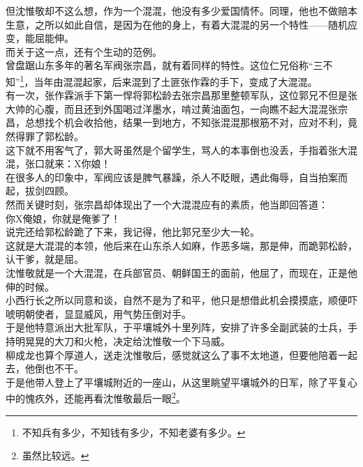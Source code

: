 \begin{multicols}{\theparacolNo}
但沈惟敬却不这么想，作为一个混混，他没有多少爱国情怀。同理，他也不做赔本生意，之所以如此自信，是因为在他的身上，有着大混混的另一个特性——随机应变，能屈能伸。\\

而关于这一点，还有个生动的范例。\\

曾盘踞山东多年的著名军阀张宗昌，就有着同样的特性。这位仁兄俗称“三不知”\footnote{不知兵有多少，不知钱有多少，不知老婆有多少。}，当年由混混起家，后来混到了土匪张作霖的手下，变成了大混混。\\

有一次，张作霖派手下第一悍将郭松龄去张宗昌那里整顿军队，这位郭兄不但是张大帅的心腹，而且还到外国喝过洋墨水，啃过黄油面包，一向瞧不起大混混张宗昌，总想找个机会收拾他，结果一到地方，不知张混混那根筋不对，应对不利，竟然得罪了郭松龄。\\

这下就不用客气了，郭大哥虽然是个留学生，骂人的本事倒也没丢，手指着张大混混，张口就来：X你娘！\\

在很多人的印象中，军阀应该是脾气暴躁，杀人不眨眼，遇此侮辱，自当拍案而起，拔剑四顾。\\

然而关键时刻，张宗昌却体现出了一个大混混应有的素质，他当即回答道：\\

你X俺娘，你就是俺爹了！\\

说完还给郭松龄跪了下来，我记得，他比郭兄至少大一轮。\\

这就是大混混的本领，他后来在山东杀人如麻，作恶多端，那是伸，而跪郭松龄，认干爹，就是屈。\\

沈惟敬就是一个大混混，在兵部官员、朝鲜国王的面前，他屈了，而现在，正是他伸的时候。\\

小西行长之所以同意和谈，自然不是为了和平，他只是想借此机会摸摸底，顺便吓唬明朝使者，显显威风，用气势压倒对手。\\

于是他特意派出大批军队，于平壤城外十里列阵，安排了许多全副武装的士兵，手持明晃晃的大刀和火枪，决定给沈惟敬一个下马威。\\

柳成龙也算个厚道人，送走沈惟敬后，感觉就这么了事不太地道，但要他陪着一起去，他倒也不干。\\

于是他带人登上了平壤城附近的一座山，从这里眺望平壤城外的日军，除了平复心中的愧疚外，还能再看沈惟敬最后一眼\footnote{虽然比较远。}。\\


\end{multicols}
